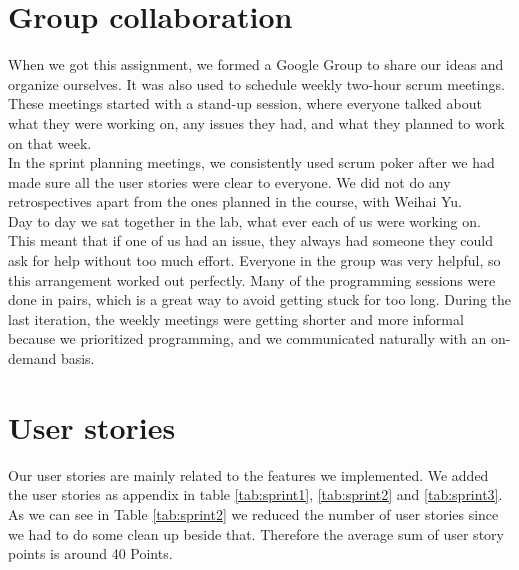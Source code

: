 \documentclass[a4paper]{article}
\begin{document}


\section{Group collaboration}
When we got this assignment, we formed a Google Group to share our ideas and organize ourselves. It was also used to schedule weekly two-hour scrum meetings. These meetings started with a stand-up session, where everyone talked about what they were working on, any issues they had, and what they planned to work on that week.\\

\noindent
In the sprint planning meetings, we consistently used scrum poker after we had made sure all the user stories were clear to everyone. We did not do any retrospectives apart from the ones planned in the course, with Weihai Yu.\\

\noindent
Day to day we sat together in the lab, what ever each of us were working on. This meant that if one of us had an issue, they always had someone they could ask for help without too much effort. Everyone in the group was very helpful, so this arrangement worked out perfectly. Many of the programming sessions were done in pairs, which is a great way to avoid getting stuck for too long. During the last iteration, the weekly meetings were getting shorter and more informal because we prioritized programming, and we communicated naturally with an on-demand basis.

\section{User stories}
Our user stories are mainly related to the features we implemented. We added the user stories as appendix in table \ref{tab:sprint1}, \ref{tab:sprint2} and \ref{tab:sprint3}. As we can see in Table \ref{tab:sprint2} we reduced the number of user stories since we had to do some clean up beside that. Therefore the average sum of user story points is around 40 Points.
\end{document}
